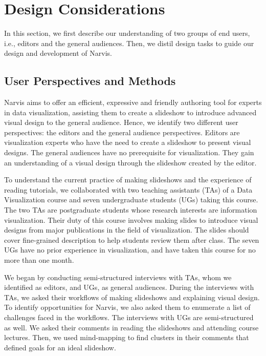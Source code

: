 \section{Design Considerations}
In this section, we first describe our understanding of two groups of end users, i.e., editors and the general audiences. Then, we distil design tasks to guide our design and development of Narvis.

\subsection{User Perspectives and Methods}

Narvis aims to offer an efficient, expressive and friendly authoring tool for experts in data visualization, assisting them to create a slideshow to introduce advanced visual design to the general audience.  
Hence, we identify two different user perspectives: the editors and the general audience perspectives. Editors are visualization experts who have the need to create a slideshow to present visual designs. The general audiences have no prerequisite for visualization. They gain an understanding of a visual design through the slideshow created by the editor. 

To understand the current practice of making slideshows and the experience of reading tutorials, we collaborated with two teaching assistants (TAs) of a Data Visualization course and seven undergraduate students (UGs) taking this course. The two TAs are postgraduate students whose research interests are information visualization. Their duty of this course involves making slides to introduce visual designs from major publications in the field of visualization. The slides should cover fine-grained description to help students review them after class. The seven UGs have no prior experience in visualization, and have taken this course for no more than one month.  

We began by conducting semi-structured interviews with TAs, whom we identified as editors, and UGs, as general audiences. During the interviews with TAs, we asked their workflows of making slideshows and explaining visual design. To identify opportunities for Narvis, we also asked them to enumerate a list of challenges faced in the workflows. The interviews with UGs are semi-structured as well. We asked their comments in reading the slideshows and attending course lectures. Then, we used mind-mapping to find clusters in their comments that defined goals for an ideal slideshow. 


